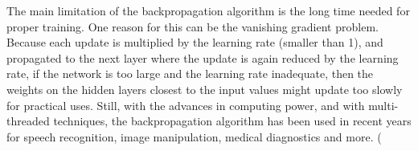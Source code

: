 \documentclass[12pt,oneside]{CUNY_CS_PhD}
\begin{document}
The main limitation of the backpropagation algorithm is the long time needed for proper training. One reason for this can be the vanishing gradient problem.
Because each update is multiplied by the learning rate (smaller than 1), and propagated to the next layer where the update is again reduced by the learning rate, if the network is too large and the learning rate inadequate, then the weights on the hidden layers closest to the input values might update too slowly for practical uses. 
Still, with the advances in computing power, and with multi-threaded techniques, the backpropagation algorithm has been used in recent years for speech recognition, image manipulation, medical diagnostics and more.
(%
\end{document}
